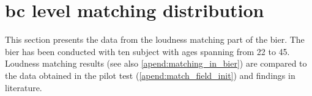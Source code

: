 \section{\gls{bc} level matching distribution}
This section presents the data from the loudness matching part of the \gls{bier}. 
The \gls{bier} has been conducted with ten subject with ages spanning from 22 to 45.
Loudness matching results (see also \autoref{apend:matching_in_bier}) are compared to the data obtained in the pilot test (\autoref{apend:match_field_init}) and findings in literature.



